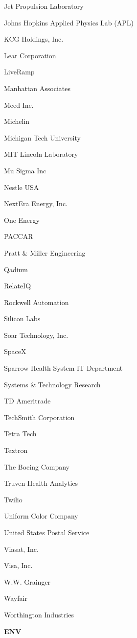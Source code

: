 \documentclass[twoside]{article}
\begin{document}
\begin{center}
\begin{multicols}{5}
\begin{FlushLeft}
\begin{compactitem}
\item Jet Propulsion Laboratory
\item Johns Hopkins Applied Physics Lab (APL)
\item KCG Holdings, Inc.
\item Lear Corporation
\item LiveRamp
\item Manhattan Associates
\item Meed Inc.
\item Michelin
\item Michigan Tech University
\item MIT Lincoln Laboratory
\item Mu Sigma Inc
\item Nestle USA
\item NextEra Energy, Inc.
\item One Energy
\item PACCAR
\item Pratt \& Miller Engineering
\item Qadium
\item RelateIQ
\item Rockwell Automation
\item Silicon Labs
\item Soar Technology, Inc.
\item SpaceX
\item Sparrow Health System IT Department
\item Systems \& Technology Research
\item TD Ameritrade
\item TechSmith Corporation
\item Tetra Tech
\item Textron
\item The Boeing Company
\item Truven Health Analytics
\item Twilio
\item Uniform Color Company
\item United States Postal Service
\item Viasat, Inc.
\item Visa, Inc.
\item W.W. Grainger
\item Wayfair
\item Worthington Industries
\end{compactitem}
        \end{FlushLeft}
        \vspace{1em}
        {\fontsize{14}{16}\selectfont \bf ENV}\\

\end{multicols}
\end{center}
\end{document}
